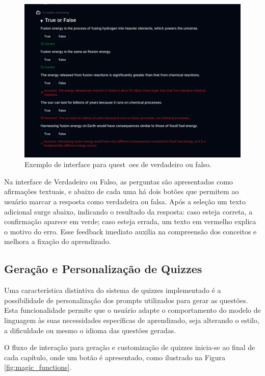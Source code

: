 \documentclass[tcc,capa]{texufpel}
\begin{document}
\begin{figure}[H]
\centering
\includegraphics[width=\textwidth,height=0.45\textheight,keepaspectratio]{exemplo-slides/graphics/images/true_or_false.png}
\caption{Exemplo de interface para quest~oes de verdadeiro ou falso.}
\label{fig:true_false_interface}
\end{figure}

Na interface de Verdadeiro ou Falso, as perguntas são apresentadas como afirmações textuais, e abaixo de cada uma há dois botões que permitem ao usuário marcar a resposta como verdadeira ou falsa. Após a seleção um texto adicional surge abaixo, indicando o resultado da resposta: caso esteja correta, a confirmação aparece em verde; caso esteja errada, um texto em vermelho explica o motivo do erro. Esse feedback imediato auxilia na compreensão dos conceitos e melhora a fixação do aprendizado.

\subsection{Geração e Personalização de Quizzes}

Uma característica distintiva do sistema de quizzes implementado é a possibilidade de personalização dos prompts utilizados para gerar as questões. Esta funcionalidade permite que o usuário adapte o comportamento do modelo de linguagem às suas necessidades específicas de aprendizado, seja alterando o estilo, a dificuldade ou mesmo o idioma das questões geradas.

O fluxo de interação para geração e customização de quizzes inicia-se ao final de cada capítulo, onde um botão é apresentado, como ilustrado na Figura \ref{fig:magic_functions}.
\end{document}
